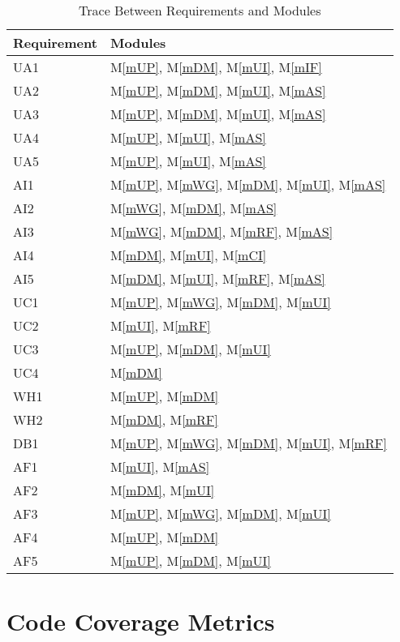 \documentclass[12pt, titlepage]{article}
\newcommand{\mref}[1]{M\ref{#1}}
\begin{document}
\begin{table}[H]
\centering
\begin{tabular}{p{} p{}}
\toprule
\textbf{Requirement} & \textbf{Modules}\\
\midrule
UA1 & \mref{mUP}, \mref{mDM}, \mref{mUI}, \mref{mIF}\\
UA2 & \mref{mUP}, \mref{mDM}, \mref{mUI}, \mref{mAS}\\
UA3 & \mref{mUP}, \mref{mDM}, \mref{mUI}, \mref{mAS}\\
UA4 & \mref{mUP}, \mref{mUI}, \mref{mAS}\\
UA5 & \mref{mUP}, \mref{mUI}, \mref{mAS}\\
AI1 & \mref{mUP}, \mref{mWG}, \mref{mDM}, \mref{mUI}, \mref{mAS}\\
AI2 & \mref{mWG}, \mref{mDM}, \mref{mAS}\\
AI3 & \mref{mWG}, \mref{mDM}, \mref{mRF}, \mref{mAS}\\
AI4 & \mref{mDM}, \mref{mUI}, \mref{mCI}\\
AI5 & \mref{mDM}, \mref{mUI}, \mref{mRF}, \mref{mAS}\\
UC1 & \mref{mUP}, \mref{mWG}, \mref{mDM}, \mref{mUI}\\
UC2 & \mref{mUI}, \mref{mRF}\\
UC3 & \mref{mUP}, \mref{mDM}, \mref{mUI}\\
UC4 & \mref{mDM}\\
WH1 & \mref{mUP}, \mref{mDM}\\
WH2 & \mref{mDM}, \mref{mRF}\\
DB1 & \mref{mUP}, \mref{mWG}, \mref{mDM}, \mref{mUI}, \mref{mRF}\\
AF1 & \mref{mUI}, \mref{mAS}\\
AF2 & \mref{mDM}, \mref{mUI}\\
AF3 & \mref{mUP}, \mref{mWG}, \mref{mDM}, \mref{mUI} \\
AF4 & \mref{mUP}, \mref{mDM} \\
AF5 & \mref{mUP}, \mref{mDM}, \mref{mUI}\\
\bottomrule
\end{tabular}
\caption{Trace Between Requirements and Modules}
\label{TblRT}
\end{table}

\section{Code Coverage Metrics}



\end{document}

